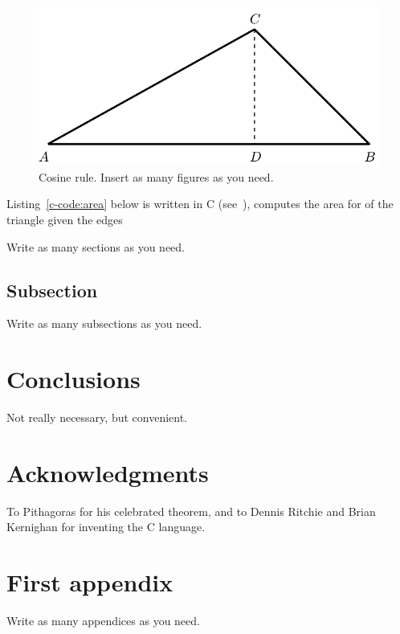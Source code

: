 \documentclass[10pt,twoside]{article}
\theoremstyle{remark}
\theoremstyle{definition}
\begin{document}
\begin{figure}[!t]
\centering
\includegraphics[scale=0.75]{triangle-crop}
\caption{Cosine rule. Insert as many figures as you need.}
\label{fig:triangle}
\end{figure}

\noindent
Listing~\ref{c-code:area} below is written in C (see~\cite{KernighanR88}),
computes the area for of the triangle given the edges
 


\noindent		  
Write as many sections as you need.

\subsection{Subsection}\label{sec:1stSubsectionOf1stSection}
\noindent Write as many subsections as you need.

\section{Conclusions}
Not really necessary, but convenient.

\section*{Acknowledgments}
%
\noindent To Pithagoras for his celebrated theorem, and to Dennis Ritchie and
Brian Kernighan for inventing the C language. 




\appendix
\section{First appendix}
\noindent Write as many appendices as you need.
\end{document}
